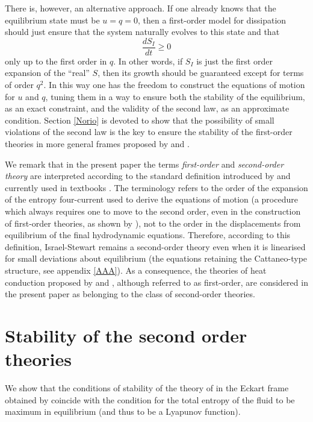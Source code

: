 \documentclass[a4paper, amsfonts, amssymb, amsmath, reprint, showkeys, nofootinbib, twoside]{revtex4-1}
\begin{document}
There is, however, an alternative approach. If one already knows that the equilibrium state must be $u=q=0$, then a first-order model for dissipation should just ensure that the system naturally evolves to this state and that 
\begin{equation}
\dfrac{dS_I}{dt} \geq 0
\end{equation}
only up to the first order in $q$. In other words, if $S_I$ is just the first order expansion of the ``real'' $S$, then its growth should be guaranteed except for terms of order $q^2$. In this way one has the freedom to construct the equations of motion for $u$ and $q$, tuning them in a way to ensure both the stability of the equilibrium, as an exact constraint, and the validity of the second law, as an approximate condition. Section \ref{Norio} is devoted to show that the possibility of small violations of the second law is the key to ensure the stability of the first-order theories in more general frames proposed by \citet{Bemfica_2018_conformi,Bemfica_2019_nonlinear} and \citet{Kovtun2019}.

We remark that in the present paper the terms \textit{first-order} and \textit{second-order theory} are interpreted according to the standard definition introduced by \citet{Hishcock1983} and currently used in textbooks \citep{rezzolla_book}. The terminology refers to the order of the expansion of the entropy four-current used to derive the equations of motion (a procedure which always requires one to move to the second order, even in the construction of first-order theories, as shown by \citet{Hishcock1983}), not to the order in the displacements from equilibrium of the final hydrodynamic equations. Therefore, according to this definition, Israel-Stewart remains a second-order theory even when it is linearised for small deviations about equilibrium (the equations retaining the Cattaneo-type structure, see appendix \ref{AAA}). As a consequence, the theories of heat conduction proposed by \citet{AnderssonLopezFirstOrder} and \citet{Van2012}, although referred to as first-order, are considered in the present paper as belonging to the class of second-order theories.






\section{Stability of the second order theories}\label{IsrStew}

We show that the conditions of stability of the theory of \citet{Israel_Stewart_1979} in the Eckart frame obtained by \citet{Hishcock1983} coincide with the condition for the total entropy of the fluid to be maximum in equilibrium (and thus to be a Lyapunov function).
\end{document}
